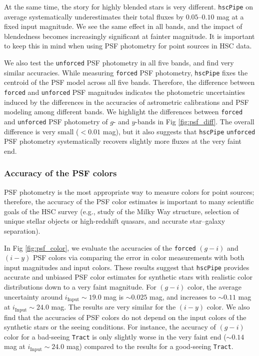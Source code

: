 \documentclass[useamsfonts]{pasj01}
\def\hscpipe{\texttt{hscPipe}}
\def\forced{\texttt{forced}}
\def\unforced{\texttt{unforced}}
\def\tract{\texttt{Tract}}
\begin{document}
    At the same time, the story for highly blended stars is very different.
    \hscpipe{} on average systematically underestimates their total fluxes by
    $0.05$--$0.10$ mag at a fixed input magnitude.
    We see the same effect in all bands, and the impact of blendedness becomes
    increasingly significant at fainter magnitude.
    It is important to keep this in mind when using PSF photometry for point
    sources in HSC data.

    We also test the \unforced{} PSF photometry in all five bands, and find very similar
    accuracies.
    While measuring \forced{} PSF photometry, \hscpipe{} fixes the centroid
    of the PSF model across all five bands.
    Therefore, the  difference between \forced{} and \unforced{} PSF magnitudes
    indicates the photometric uncertainties induced by the differences in the accuracies of
    astrometric calibrations and PSF modeling among different bands.
    We highlight the differences between \forced{} and \unforced{} PSF photometry of
    $g$- and $y$-bands in Fig \ref{fig:psf_diff}.
    The overall difference is very small ($<0.01$ mag), but it also suggests that
    \hscpipe{} \unforced{} PSF photometry systematically recovers slightly more fluxes
    at the very faint end.

\subsubsection{Accuracy of the PSF colors}

    PSF photometry is the most appropriate way to measure colors for point
    sources; therefore, the accuracy of the PSF color estimates is important to many scientific goals of the HSC survey
    (e.g., study of the Milky Way structure, selection of unique stellar objects or
    high-redshift quasars, and accurate star--galaxy separation).

    In Fig \ref{fig:psf_color}, we evaluate the accuracies of the \forced{} $(g-i)$
    and $(i-y)$ PSF colors via comparing the error in color measurements with both
    input magnitudes and input colors.
    These results suggest that \hscpipe{} provides accurate and unbiased PSF color
    estimates for synthetic stars with realistic color distributions down to a very faint
    magnitude.
    For $(g-i)$ color, the average uncertainty around $i_{\mathrm{Input}}{\sim}19.0$ mag
    is ${\sim}0.025$ mag, and increases to ${\sim}0.11$ mag at
    $i_{\mathrm{Input}}{\sim}24.0$ mag.
    The results are very similar for the $(i-y)$ color.
    We also find that the accuracies of PSF colors do not depend on the input colors of
    the synthetic stars or the seeing conditions.
    For instance, the accuracy of $(g-i)$ color for a bad-seeing \tract{} is only
    slightly worse in the very faint end (${\sim}0.14$ mag at
    $i_{\mathrm{Input}}{\sim}24.0$ mag) compared to the results for a good-seeing \tract{}.
\end{document}
